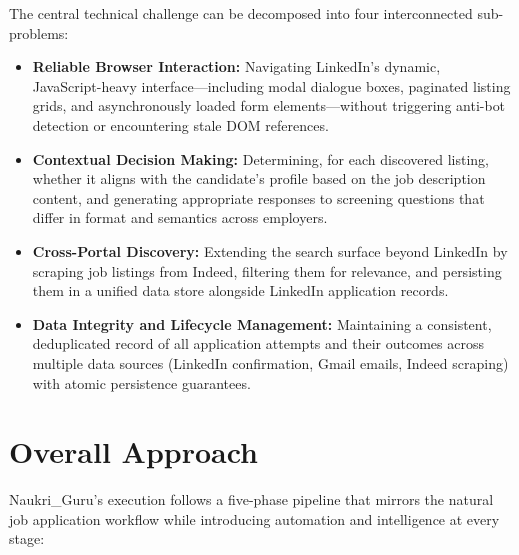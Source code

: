 \documentclass[12pt, a4paper, oneside]{report}
\begin{document}
The central technical challenge can be decomposed into four interconnected sub-problems:

\begin{itemize}
    \item \textbf{Reliable Browser Interaction:} Navigating LinkedIn's dynamic, JavaScript-heavy interface---including modal dialogue boxes, paginated listing grids, and asynchronously loaded form elements---without triggering anti-bot detection or encountering stale DOM references.
    \item \textbf{Contextual Decision Making:} Determining, for each discovered listing, whether it aligns with the candidate's profile based on the job description content, and generating appropriate responses to screening questions that differ in format and semantics across employers.
    \item \textbf{Cross-Portal Discovery:} Extending the search surface beyond LinkedIn by scraping job listings from Indeed, filtering them for relevance, and persisting them in a unified data store alongside LinkedIn application records.
    \item \textbf{Data Integrity and Lifecycle Management:} Maintaining a consistent, deduplicated record of all application attempts and their outcomes across multiple data sources (LinkedIn confirmation, Gmail emails, Indeed scraping) with atomic persistence guarantees.
\end{itemize}

\section{Overall Approach}
\label{sec:overall-approach}

Naukri\_Guru's execution follows a five-phase pipeline that mirrors the natural job application workflow while introducing automation and intelligence at every stage:
\end{document}
